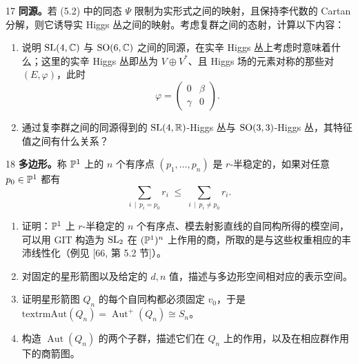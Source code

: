 \begin{prob}{17} \textbf{同源。}若 (5.2) 中的同态 $\Psi$ 限制为实形式之间的映射，且保持李代数的 Cartan 分解，则它诱导实 Higgs 丛之间的映射。考虑复群之间的态射，计算以下内容：
\begin{enumerate}[label=(\roman*),leftmargin=2.2em]
\item 说明 $\mathrm{SL}(4,\mathbb{C})$ 与 $\mathrm{SO}(6,\mathbb{C})$ 之间的同源，在实辛 Higgs 丛上考虑时意味着什么；这里的实辛 Higgs 丛即丛为 $V\oplus V^{*}$、且 Higgs 场的元素对称的那些对 $(E,\varphi)$，此时
\[
\varphi = \begin{pmatrix} 0 & \beta \\ \gamma & 0 \end{pmatrix}.
\]
\item 通过复李群之间的同源得到的 $\mathrm{SL}(4,\mathbb{R})$-Higgs 丛与 $\mathrm{SO}(3,3)$-Higgs 丛，其特征值之间有什么关系？
\end{enumerate}
\end{prob}

\begin{prob}{18} \textbf{多边形。}称 $\mathbb{P}^{1}$ 上的 $n$ 个有序点 $(p_1,\dots,p_n)$ 是 $r$-半稳定的，如果对任意 $p_0\in\mathbb{P}^{1}$ 都有
\[
\sum_{i\,\mid\,p_i=p_0} r_i \;\leqslant\; \sum_{i\,\mid\,p_i\neq p_0} r_i .
\]
\begin{enumerate}[label=(\roman*),leftmargin=2.2em]
\item 证明：$\mathbb{P}^{1}$ 上 $r$-半稳定的 $n$ 个有序点、模去射影直线的自同构所得的模空间，可以用 GIT 构造为 $\mathrm{SL}_2$ 在 $(\mathbb{P}^{1})^{n}$ 上作用的商，所取的是与这些权重相应的丰沛线性化（例见 [66, 第 5.2 节]）。
\item 对固定的星形箭图以及给定的 $d,n$ 值，描述与多边形空间相对应的表示空间。
\item 证明星形箭图 $Q_n$ 的每个自同构都必须固定 $v_0$，于是 $\mathrm{textrmAut}(Q_n) = \operatorname{Aut}^{+}(Q_n) \cong S_n$。
\item 构造 $\operatorname{Aut}(Q_n)$ 的两个子群，描述它们在 $Q_n$ 上的作用，以及在相应群作用下的商箭图。
\end{enumerate}
\end{prob}

